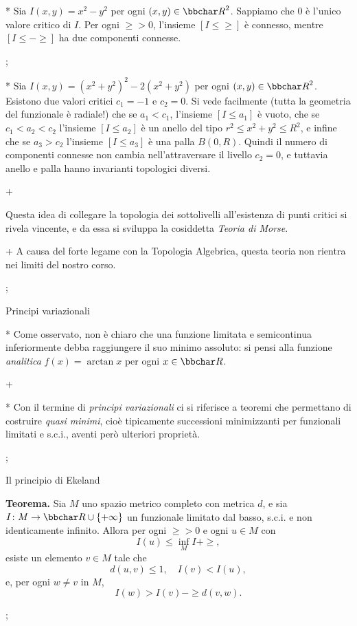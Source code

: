 * Sia $I(x,y) = x^2-y^2$ per ogni $(x,y) \in \R^2$. Sappiamo che $0$
  \`e l'unico valore critico di $I$. Per ogni $\ge>0$, l'insieme $[I
  \leq \ge]$ \`e connesso, mentre $[I \leq -\ge]$ ha due componenti
  connesse.

\pg;

* Sia $I(x,y) = (x^2+y^2)^2-2(x^2+y^2)$ per ogni $(x,y) \in
  \R^2$. Esistono due valori critici $c_1=-1$ e $c_2=0$. Si vede
  facilmente (tutta la geometria del funzionale \`e radiale!) che se
  $a_1<c_1$, l'insieme $[I \leq a_1]$ \`e vuoto, che se $c_1<a_2<c_2$
  l'insieme $[I \leq a_2]$ \`e un anello del tipo $r^2 \leq x^2+y^2
  \leq R^2$, e infine che se $a_3>c_2$ l'insieme $[I \leq a_3]$ \`e
  una palla $B(0,R)$. Quindi il numero di componenti connesse non
  cambia nell'attraversare il livello $c_2=0$, e tuttavia anello e
  palla hanno invarianti topologici diversi.

\pg+

Questa idea di collegare la topologia dei sottolivelli all'esistenza
di punti critici si rivela vincente, e da essa si sviluppa la
cosiddetta {\em Teoria di Morse}.

\pg+ A causa del forte legame con la Topologia Algebrica, questa
teoria non rientra nei limiti del nostro corso.

\pg;

\sec Principi variazionali

* Come osservato, non \`e chiaro che una funzione limitata e
  semicontinua inferiormente debba raggiungere il suo minimo assoluto:
  si pensi alla funzione {\em analitica} $f(x)=\arctan x$ per ogni $x
  \in \R$.

\pg+

* Con il termine di {\it principi variazionali} ci si riferisce a
  teoremi che permettano di costruire {\it quasi minimi}, cio\`e
  tipicamente successioni minimizzanti per funzionali limitati e
  s.c.i., aventi per\`o ulteriori propriet\`a.

\pg;

\sec Il principio di Ekeland

{\bf Teorema.} Sia $M$ uno spazio metrico completo con metrica $d$, e
sia $I \colon M \to \R \cup \{+\infty\}$ un funzionale limitato dal
basso, s.c.i. e non identicamente infinito. Allora per ogni $\ge>0$ e
ogni $u \in M$ con
$$
I(u) \leq \inf_M I + \ge,
$$
esiste un elemento $v \in M$ tale che
$$
d(u,v) \leq 1, \quad I(v) < I(u),
$$
e, per ogni $w \neq v$ in $M$,
$$
I(w) > I(v)-\ge d(v,w).
$$

\pg;

